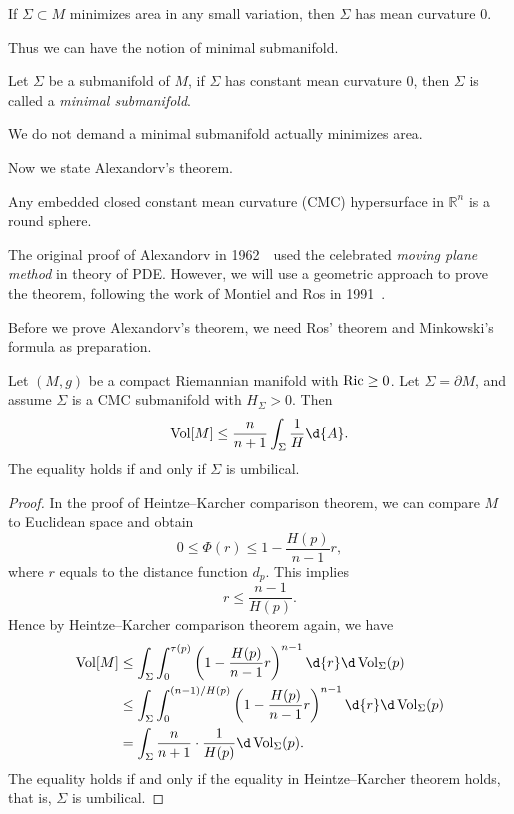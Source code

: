\begin{cor}
    If $\Sigma\subset M$ minimizes area in any small variation, then $\Sigma$ has mean curvature $0$.
\end{cor}

Thus we can have the notion of minimal submanifold.
\begin{defn}
    Let $\Sigma$ be a submanifold of $M$, if $\Sigma$ has constant mean curvature $0$, then $\Sigma$ is called a \emph{minimal submanifold}.
\end{defn}

\begin{rem}
    We do not demand a minimal submanifold actually minimizes area.
\end{rem}

Now we state Alexandorv's theorem.
\begin{thm}[Alexandorv]
    Any embedded closed constant mean curvature (CMC) hypersurface in $\mathbb{R}^n$ is a round sphere.
\end{thm}

\begin{rem}
    The original proof of Alexandorv in 1962~\cite{Aleksandrov}~used the celebrated \emph{moving plane method} in theory of PDE.
    However, we will use a geometric approach to prove the theorem, following the work of Montiel and Ros in 1991~\cite{Montiel-Ros}.
\end{rem}

Before we prove Alexandorv's theorem, we need Ros' theorem and Minkowski's formula as preparation.

\begin{thm}[Ros]
    Let $(M,g)$ be a compact Riemannian manifold with $\operatorname{Ric}\geq 0$.
    Let $\Sigma=\partial M$, and assume $\Sigma$ is a CMC submanifold with $H_\Sigma>0$.
    Then
    \[\Vol[M]\leq\frac{n}{n+1}\int_\Sigma\frac{1}{H}\d{A}.\]
    The equality holds if and only if $\Sigma$ is umbilical.
\end{thm}
\begin{proof}
    In the proof of Heintze--Karcher comparison theorem, we can compare $M$ to Euclidean space and obtain
    \[0\leq\Phi(r)\leq 1-\frac{H(p)}{n-1}r,\]
    where $r$ equals to the distance function $d_p$.
    This implies
    \[r\leq\frac{n-1}{H(p)}.\]
    Hence by Heintze--Karcher comparison theorem again, we have
    \begin{align*}
        \Vol[M]&\leq\int_\Sigma\int_0^{\tau(p)}\left(1-\frac{H(p)}{n-1}r\right)^{n-1}\d{r}\d\Vol_{\Sigma}(p)\\
        &\leq\int_\Sigma\int_{0}^{(n-1)/H(p)}\left(1-\frac{H(p)}{n-1}r\right)^{n-1}\d{r}\d\Vol_{\Sigma}(p)\\
        &=\int_\Sigma\frac{n}{n+1}\cdot\frac{1}{H(p)}\d\Vol_\Sigma(p).
    \end{align*}
    The equality holds if and only if the equality in Heintze--Karcher theorem holds, that is, $\Sigma$ is umbilical. 
\end{proof}

